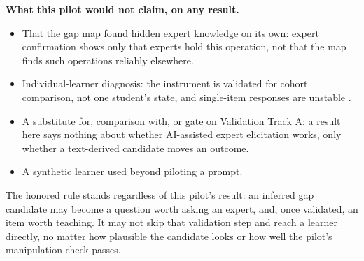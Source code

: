 \textbf{What this pilot would not claim, on any result.}
\begin{itemize}[noitemsep]
  \item That the gap map found hidden expert knowledge on its own: expert confirmation shows only
    that experts hold this operation, not that the map finds such operations reliably elsewhere.
  \item Individual-learner diagnosis: the instrument is validated for cohort comparison, not one
    student's state, and single-item responses are unstable
    \parencite{lasry2011fci,madsen2017inventories}.
  \item A substitute for, comparison with, or gate on Validation Track A: a result here says
    nothing about whether AI-assisted expert elicitation works, only whether a text-derived
    candidate moves an outcome.
  \item A synthetic learner used beyond piloting a prompt.
\end{itemize}

The honored rule stands regardless of this pilot's result: an inferred gap candidate may become a
question worth asking an expert, and, once validated, an item worth teaching. It may not skip that
validation step and reach a learner directly, no matter how plausible the candidate looks or how
well the pilot's manipulation check passes.
